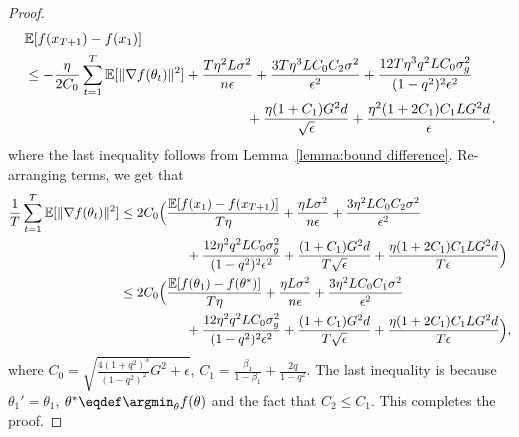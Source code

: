 \documentclass[11pt]{article}
\begin{document}
\begin{proof}
\begin{align*}
    &\mathbb E[f(x_{T+1})-f(x_1)]\\
    &\leq -\frac{\eta}{2C_0}\sum_{t=1}^T\mathbb E[\|\nabla f(\theta_t)\|^2]+\frac{T\eta^2 L \sigma^2}{n\epsilon}+\frac{3T\eta^3 LC_0C_2\sigma^2}{\epsilon^2}+\frac{12T\eta^3q^2LC_0\sigma_g^2}{(1-q^2)^2\epsilon^2}  \\
    &\hspace{2.2in} + \frac{\eta (1+C_1)G^2d}{\sqrt\epsilon}+\frac{\eta^2 (1+2C_1)C_1LG^2d}{\epsilon}.
\end{align*}
where the last inequality follows from Lemma~\ref{lemma:bound difference}. Re-arranging terms, we get that
\begin{align*}
    \frac{1}{T}\sum_{t=1}^T \mathbb E[\|\nabla f(\theta_t)\|^2]&\leq 2C_0\Big(\frac{\mathbb E[f(x_1)-f(x_{T+1})]}{T\eta}+\frac{\eta L \sigma^2}{n\epsilon}+\frac{3\eta^2 LC_0C_2\sigma^2}{\epsilon^2}  \\
    &\hspace{0.7in} + \frac{12\eta^2q^2LC_0\sigma_g^2}{(1-q^2)^2\epsilon^2}+\frac{ (1+C_1)G^2d}{T\sqrt\epsilon}+\frac{\eta (1+2C_1)C_1LG^2d}{T\epsilon} \Big)\\
    &\leq 2C_0\Big(\frac{\mathbb E[f(\theta_1)-f(\theta^*)]}{T\eta}+\frac{\eta L \sigma^2}{n\epsilon}+\frac{3\eta^2 LC_0C_1\sigma^2}{\epsilon^2}  \\
    &\hspace{0.7in} + \frac{12\eta^2q^2LC_0\sigma_g^2}{(1-q^2)^2\epsilon^2}+\frac{ (1+C_1)G^2d}{T\sqrt\epsilon}+\frac{\eta (1+2C_1)C_1LG^2d}{T\epsilon} \Big),
\end{align*}
where $C_0=\sqrt{\frac{4(1+q^2)^3}{(1-q^2)^2}G^2+\epsilon}$, $C_1=\frac{\beta_1}{1-\beta_1}+\frac{2q}{1-q^2}$. The last inequality is because $\theta_1'=\theta_1$, $\theta^* \eqdef \argmin_\theta f(\theta)$ and the fact that $C_2\leq C_1$. This completes the proof.



\end{proof}
\end{document}
